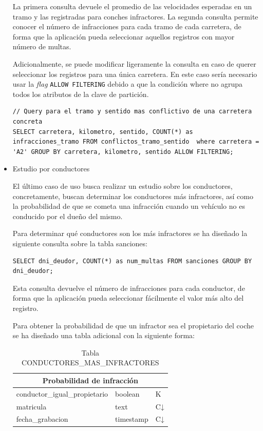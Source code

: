 \documentclass[]{article}
\begin{document}
\begin{itemize}
    La primera consulta devuele el promedio de las velocidades esperadas en un tramo y las registradas para conches infractores. La segunda consulta permite conocer el número de infracciones para cada tramo de cada carretera, de forma que la aplicación pueda seleccionar aquellos registros con mayor número de multas.

    Adicionalmente, se puede modificar ligeramente la consulta en caso de querer seleccionar los registros para una única carretera. En este caso sería necesario usar la \textit{flag} \texttt{ALLOW FILTERING} debido a que la condición where no agrupa todos los atributos de la clave de partición. 

\begin{lstlisting}[language=cql, caption=Querys modificada para el caso de uso 2]
// Query para el tramo y sentido mas conflictivo de una carretera concreta
SELECT carretera, kilometro, sentido, COUNT(*) as infracciones_tramo FROM conflictos_tramo_sentido  where carretera = 'A2' GROUP BY carretera, kilometro, sentido ALLOW FILTERING;
    \end{lstlisting}

 
    \item Estudio por conductores

    El último caso de uso busca realizar un estudio sobre los conductores,
    concretamente, buscan determinar los conductores más infractores, así como
    la probabilidad de que se cometa una infracción cuando un vehículo no es
    conducido por el dueño del mismo.

    Para determinar qué conductores son los más infractores se ha diseñado la siguiente consulta sobre la tabla sanciones:
    \begin{lstlisting}[language=cql, caption=Consulta para obtener los conductores más infractores]
SELECT dni_deudor, COUNT(*) as num_multas FROM sanciones GROUP BY dni_deudor;
    \end{lstlisting}

    Esta consulta devuelve el número de infracciones para cada conductor, de forma que la aplicación pueda seleccionar fácilmente el valor más alto del registro.

    Para obtener la probabilidad de que un infractor sea el propietario del coche se ha diseñado una tabla adicional con la siguiente forma:

    \begin{table}[H]
        \centering
        \begin{tabular}{lll} 
            \toprule
            \multicolumn{3}{c}{\large\textbf{Probabilidad de infracción}} \\ 
            \midrule
            conductor\_igual\_propietario & boolean & K\\
            matricula        & text      & C↓\\
            fecha\_grabacion & timestamp & C↓\\
            \bottomrule
        \end{tabular}
        \caption {Tabla CONDUCTORES\_MAS\_INFRACTORES}
     \end{table}


\end{itemize}
\end{document}
